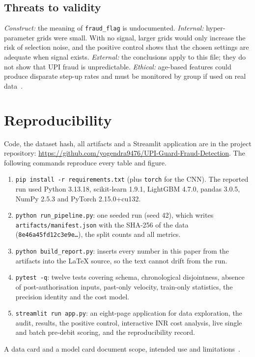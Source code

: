 \documentclass[conference]{IEEEtran}
\begin{document}
\subsection{Threats to validity}
\emph{Construct:} the meaning of \texttt{fraud\_flag} is undocumented. \emph{Internal:} hyper-parameter grids were small. With no signal, larger grids would only increase the risk of selection noise, and the positive control shows that the chosen settings are adequate when signal exists. \emph{External:} the conclusions apply to this file; they do not show that UPI fraud is unpredictable. \emph{Ethical:} age-based features could produce disparate step-up rates and must be monitored by group if used on real data~\cite{mitchell2019}.

\section{Reproducibility}
Code, the dataset hash, all artifacts and a Streamlit application are in the project repository: \url{https://github.com/yogendra9476/UPI-Guard-Fraud-Detection}. The following commands reproduce every table and figure.
\begin{enumerate}
\item \texttt{pip install -r requirements.txt} (plus \texttt{torch} for the CNN). The reported run used Python 3.13.18, scikit-learn 1.9.1, LightGBM 4.7.0, pandas 3.0.5, NumPy 2.5.3 and PyTorch 2.15.0+cu132.
\item \texttt{python run\_pipeline.py}: one seeded run (seed 42), which writes \texttt{artifacts/manifest.json} with the SHA-256 of the data (\texttt{8e46a45fd12c3e9e\ldots}), the split counts and all metrics.
\item \texttt{python build\_report.py}: inserts every number in this paper from the artifacts into the \LaTeX{} source, so the text cannot drift from the run.
\item \texttt{pytest -q}: twelve tests covering schema, chronological disjointness, absence of post-authorisation inputs, past-only velocity, train-only statistics, the precision identity and the cost model.
\item \texttt{streamlit run app.py}: an eight-page application for data exploration, the audit, results, the positive control, interactive INR cost analysis, live single and batch pre-debit scoring, and the reproducibility record.
\end{enumerate}
A data card and a model card document scope, intended use and limitations~\cite{gebru2021,mitchell2019}.
\end{document}
